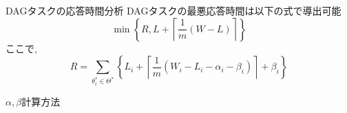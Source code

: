 




\begin{frame}{DAGタスクの応答時間分析}
    DAGタスクの最悪応答時間は以下の式で導出可能
    \[
        \min \left\{R, L+\left\lceil\frac{1}{m}(W-L)\right\rceil\right\}
    \]
    ここで,
    \begin{equation*}
        R=\sum_{\theta_{i}^{*} \in \Theta^{*}}\left\{L_{i}+\left\lceil\frac{1}{m}\left(W_{i}-L_{i}-\alpha_{i}-\beta_{i}\right)\right\rceil+\beta_{i}\right\}
    \end{equation*}
\end{frame}

\begin{frame}{$\alpha, \beta$計算方法}
\end{frame}
